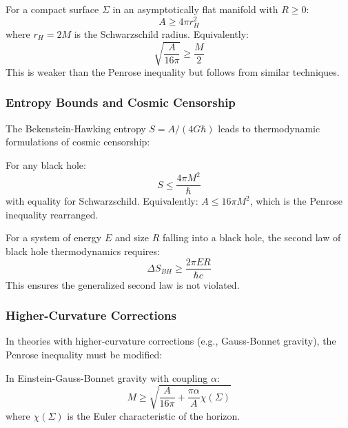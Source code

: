 \begin{conjecture}
For a compact surface $\Sigma$ in an asymptotically flat manifold with $R \geq 0$:
\begin{equation}
A \geq 4\pi r_H^2
\end{equation}
where $r_H = 2M$ is the Schwarzschild radius. Equivalently:
\begin{equation}
\sqrt{\frac{A}{16\pi}} \geq \frac{M}{2}
\end{equation}
This is weaker than the Penrose inequality but follows from similar techniques.
\end{conjecture}

\subsubsection{Entropy Bounds and Cosmic Censorship}

The Bekenstein-Hawking entropy $S = A/(4G\hbar)$ leads to thermodynamic formulations of cosmic censorship:

\begin{conjecture}
For any black hole:
\begin{equation}
S \leq \frac{4\pi M^2}{\hbar}
\end{equation}
with equality for Schwarzschild. Equivalently: $A \leq 16\pi M^2$, which is the Penrose inequality rearranged.
\end{conjecture}

\begin{conjecture}
For a system of energy $E$ and size $R$ falling into a black hole, the second law of black hole thermodynamics requires:
\begin{equation}
\Delta S_{BH} \geq \frac{2\pi ER}{\hbar c}
\end{equation}
This ensures the generalized second law is not violated.
\end{conjecture}

\subsubsection{Higher-Curvature Corrections}

In theories with higher-curvature corrections (e.g., Gauss-Bonnet gravity), the Penrose inequality must be modified:

\begin{conjecture}
In Einstein-Gauss-Bonnet gravity with coupling $\alpha$:
\begin{equation}
M \geq \sqrt{\frac{A}{16\pi} + \frac{\pi \alpha}{A}\chi(\Sigma)}
\end{equation}
where $\chi(\Sigma)$ is the Euler characteristic of the horizon.
\end{conjecture}

